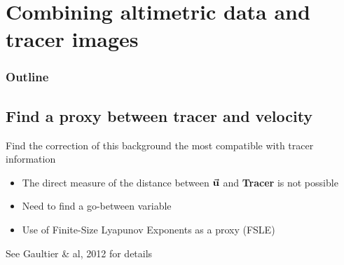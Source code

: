 \documentclass[compress,slidescentered,notes=show]{beamer}
\begin{document}
\section[Method]{Combining altimetric data and tracer images}
\begin{frame}
  \frametitle{Outline}
  \tableofcontents[currentsection]
\end{frame}

	\subsection[proxy FSLE]{Find a proxy between tracer and velocity}
\begin{frame}
  \vspace{0.6cm}
  \begin{block}{Find the correction of this background the most compatible with tracer information}
    \begin{itemize}
     \item The direct measure of the distance between $\vec{\bf{u}}$ and \textbf{Tracer} is not possible
     \item Need to find a go-between variable
     \item Use of Finite-Size Lyapunov Exponents as a proxy (FSLE)
    \end{itemize}
  \end{block}
    \small{See Gaultier \& al, 2012 for details}
\end{frame}

\begin{frame}

\end{frame}
\end{document}
